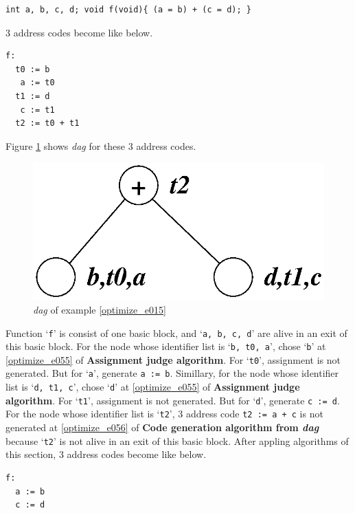 \begin{Example}
\label{optimize_e015}
\begin{verbatim}
int a, b, c, d; void f(void){ (a = b) + (c = d); }
\end{verbatim}
3 address codes become like below.
\begin{verbatim}
f:
  t0 := b
   a := t0
  t1 := d
   c := t1
  t2 := t0 + t1
\end{verbatim}
Figure \ref{optimize_e016} shows {\em dag} for these 3 address codes.
\begin{figure}[htbp]
\begin{center}
\includegraphics[width=0.7\linewidth,height=0.362\linewidth]{opt005.eps}
\caption{{\em dag} of example \ref{optimize_e015}}
\label{optimize_e016}
\end{center}
\end{figure}
Function `{\tt{f}}' is consist of one basic block, and 
`{\tt{a, b, c, d}}' are alive in an exit of this basic block.
For the node whose identifier list is `{\tt{b, t0, a}}',
chose `{\tt{b}}' at \ref{optimize_e055} of {\bf Assignment judge
 algorithm}. For `{\tt{t0}}', assignment is not generated.
But for `{\tt{a}}', generate {\tt{a := b}}.
Simillary, for the node whose identifier list is `{\tt{d, t1, c}}',
chose `{\tt{d}}' at \ref{optimize_e055} of {\bf Assignment judge
 algorithm}. For `{\tt{t1}}', assignment is not generated.
But for `{\tt{d}}', generate {\tt{c := d}}.
For the node whose identifier list is `{\tt{t2}}',
3 address code {\tt{t2 := a + c}} is not generated
at \ref{optimize_e056} of {\bf Code generation algorithm from {\em dag}}
because `{\tt{t2}}' is not alive in an exit of this basic block.
After appling algorithms of this section,
3 address codes become like below.
\begin{verbatim}
f:
  a := b
  c := d
\end{verbatim}
\end{Example}

